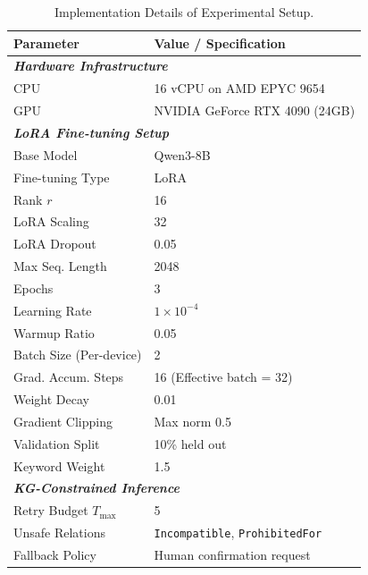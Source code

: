 \documentclass[preprint,5p,times,twocolumn,fleqn]{elsarticle}
\begin{document}
\begin{table}[htbp]
\centering
\caption{Implementation Details of Experimental Setup.}
\label{tab:impl_details}
\small
\renewcommand{\arraystretch}{0.95}

\begin{tabularx}{\linewidth}{l X}
    \toprule
    \textbf{Parameter} & \textbf{Value / Specification} \\
    \midrule

    \multicolumn{2}{l}{\textit{\textbf{Hardware Infrastructure}}} \\
    \quad CPU & 16 vCPU on AMD EPYC 9654 \\
    \quad GPU & NVIDIA GeForce RTX 4090 (24GB) \\
    \midrule

    \multicolumn{2}{l}{\textit{\textbf{LoRA Fine-tuning Setup}}} \\
    \quad Base Model & Qwen3-8B \\
    \quad Fine-tuning Type & LoRA \\
    \quad Rank $r$ & 16 \\
    \quad LoRA Scaling & 32 \\
    \quad LoRA Dropout & 0.05 \\
    \quad Max Seq. Length & 2048 \\
    \quad Epochs & 3 \\
    \quad Learning Rate & $1 \times 10^{-4}$ \\
    \quad Warmup Ratio & 0.05 \\
    \quad Batch Size (Per-device) & 2 \\
    \quad Grad. Accum. Steps & 16 (Effective batch = 32) \\
    \quad Weight Decay & 0.01 \\
    \quad Gradient Clipping & Max norm 0.5 \\
    \quad Validation Split & 10\% held out \\
    \quad Keyword Weight & 1.5 \\
    \midrule

    \multicolumn{2}{l}{\textit{\textbf{KG-Constrained Inference}}} \\
    \quad Retry Budget $T_{\max}$ & 5 \\
    \quad Unsafe Relations & \texttt{Incompatible}, \texttt{ProhibitedFor} \\
    \quad Fallback Policy & Human confirmation request \\
    \bottomrule
\end{tabularx}
\end{table}
\end{document}
